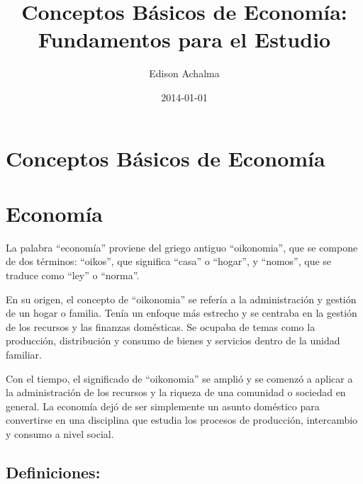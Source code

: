 \documentclass[
  jou,
  floatsintext,
  longtable,
  a4paper,
  nolmodern,
  notxfonts,
  notimes,
  colorlinks=true,linkcolor=blue,citecolor=blue,urlcolor=blue]{apa7}
\title{Conceptos Básicos de Economía: Fundamentos para el Estudio}
\author{Edison Achalma}
\affiliation{
{Escuela Profesional de Economía, Universidad Nacional de San Cristóbal
de Huamanga}}
\date{2014-01-01}
\begin{document}
\maketitle

\hypertarget{toc}{}
\tableofcontents
\newpage
\section[Introduction]{Conceptos Básicos de Economía}

\setcounter{secnumdepth}{-\maxdimen} %

\setlength\LTleft{0pt}


\section{Economía}\label{economuxeda}

La palabra ``economía'' proviene del griego antiguo ``oikonomia'', que
se compone de dos términos: ``oikos'', que significa ``casa'' o
``hogar'', y ``nomos'', que se traduce como ``ley'' o ``norma''.

En su origen, el concepto de ``oikonomia'' se refería a la
administración y gestión de un hogar o familia. Tenía un enfoque más
estrecho y se centraba en la gestión de los recursos y las finanzas
domésticas. Se ocupaba de temas como la producción, distribución y
consumo de bienes y servicios dentro de la unidad familiar.

Con el tiempo, el significado de ``oikonomia'' se amplió y se comenzó a
aplicar a la administración de los recursos y la riqueza de una
comunidad o sociedad en general. La economía dejó de ser simplemente un
asunto doméstico para convertirse en una disciplina que estudia los
procesos de producción, intercambio y consumo a nivel social.

\subsection{Definiciones:}\label{definiciones}
\end{document}
